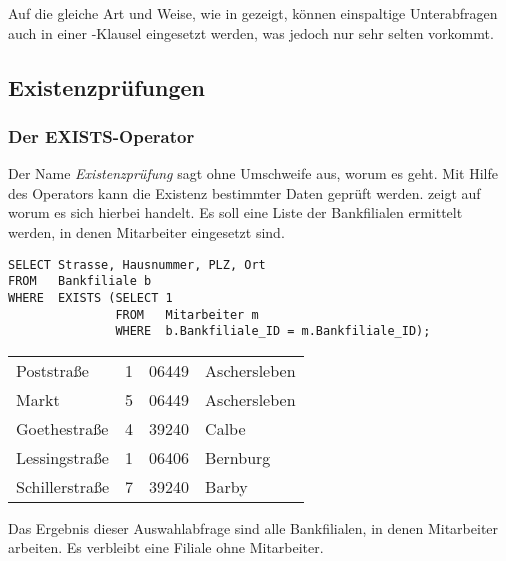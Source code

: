 Auf die gleiche Art und Weise, wie in  gezeigt, können einspaltige Unterabfragen auch in einer \HAVING-Klausel eingesetzt werden, was jedoch nur sehr selten vorkommt.
\subsection{Existenzprüfungen}
\subsubsection{Der EXISTS-Operator}
Der Name \textit{Existenzprüfung} sagt ohne Umschweife aus, worum es geht. Mit Hilfe des Operators  kann die Existenz bestimmter Daten geprüft werden.  zeigt auf worum es sich hierbei handelt. Es soll eine Liste der Bankfilialen ermittelt werden, in denen Mitarbeiter eingesetzt sind.
\begin{lstlisting}[language=oracle_sql,caption={Der \languageorasql{EXISTS}-Operator},label=sql06_08]
SELECT Strasse, Hausnummer, PLZ, Ort
FROM   Bankfiliale b
WHERE  EXISTS (SELECT 1
               FROM   Mitarbeiter m
               WHERE  b.Bankfiliale_ID = m.Bankfiliale_ID);
          \end{lstlisting}
\begin{center}
    \begin{small}
        \tablehead{}
        \tabletail {
        }
        \begin{msoraclesql}
            \begin{supertabular}{llll}
                Poststraße & 1 & 06449 & Aschersleben \\
                Markt & 5 & 06449 & Aschersleben \\
                Goethestraße & 4 & 39240 & Calbe \\
                Lessingstraße & 1 & 06406 & Bernburg \\
                Schillerstraße & 7 & 39240 & Barby \\
            \end{supertabular}
        \end{msoraclesql}
    \end{small}
\end{center}
Das Ergebnis dieser Auswahlabfrage sind alle Bankfilialen, in denen Mitarbeiter arbeiten. Es verbleibt eine Filiale ohne Mitarbeiter.

